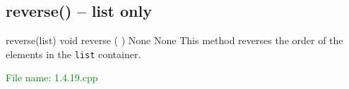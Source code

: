 
\subsection{reverse() – list only} %
\begin{methodinfo}
  {reverse(list)}
  {void reverse ( )}
  {None}
  {None}
  {This method reverses the order of the elements in the \texttt{list} container.}
\end{methodinfo}
\textcolor{green}{File name: 1.4.19.cpp}

